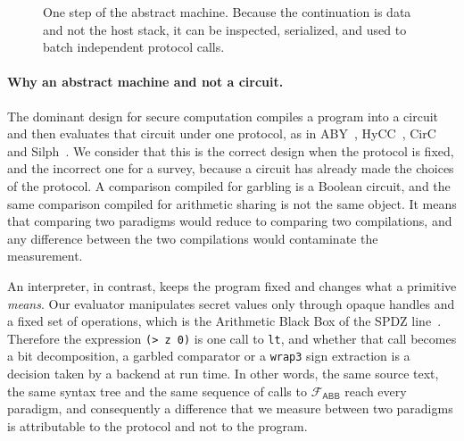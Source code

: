 \documentclass[11pt]{article}
\newcommand{\bt}[1]{\texttt{#1}}
\newcommand{\Fabb}{\mathcal{F}_{\mathsf{ABB}}}
\begin{document}
\begin{figure}[t]
\centering
{}
\caption{One step of the abstract machine. Because the continuation is data and not the host
stack, it can be inspected, serialized, and used to batch independent protocol calls.}
\label{fig:cek}
\end{figure}

\paragraph{Why an abstract machine and not a circuit.} The dominant design for secure
computation compiles a program into a circuit and then evaluates that circuit under one
protocol, as in ABY~\cite{ABY}, HyCC~\cite{HyCC}, CirC~\cite{CirC} and
Silph~\cite{Silph}. We consider that this is the correct design when the protocol is fixed,
and the incorrect one for a survey, because a circuit has already made the choices of the
protocol. A comparison compiled for garbling is a Boolean circuit, and the same comparison
compiled for arithmetic sharing is not the same object. It means that comparing two paradigms
would reduce to comparing two compilations, and any difference between the two compilations
would contaminate the measurement.

An interpreter, in contrast, keeps the program fixed and changes what a primitive
\emph{means}. Our evaluator manipulates secret values only through opaque handles and a fixed
set of operations, which is the Arithmetic Black Box of the SPDZ line~\cite{DamgardNielsen,SPDZ}.
Therefore the expression \bt{(> z 0)} is one call to \bt{lt}, and whether that call becomes a
bit decomposition, a garbled comparator or a \bt{wrap3} sign extraction is a decision taken by
a backend at run time. In other words, the same source text, the same syntax tree and the same
sequence of calls to $\Fabb$ reach every paradigm, and consequently a difference that we
measure between two paradigms is attributable to the protocol and not to the program.
\end{document}
